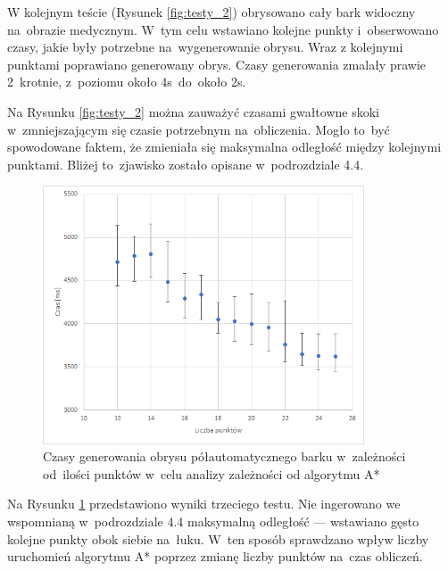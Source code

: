 \documentclass[a4paper,11pt,twoside,openright]{report}
\theoremstyle{definition}
\begin{document}
\bigskip

W kolejnym teście (Rysunek \ref{fig:testy_2}) obrysowano
cały bark widoczny na~obrazie medycznym. W~tym celu wstawiano kolejne
punkty i~obserwowano czasy, jakie były potrzebne na~wygenerowanie obrysu. Wraz z
kolejnymi punktami poprawiano generowany obrys. Czasy generowania zmalały prawie 2~krotnie, z~poziomu
około 4s~do~około 2s.



Na Rysunku \ref{fig:testy_2} można zauważyć czasami gwałtowne skoki w~zmniejszającym
się czasie potrzebnym na~obliczenia. Mogło to~być spowodowane faktem, że zmieniała
się maksymalna odległość między kolejnymi punktami. Bliżej to~zjawisko zostało
opisane w~podrozdziale 4.4.

\begin{figure}[h!]
	\center
	\includegraphics[width=0.85\textwidth]{150}
	\caption{Czasy generowania obrysu półautomatycznego barku w~zależności od~ilości punktów
	w~celu analizy zależności od algorytmu A*}
    	\label{fig:testy_3}
\end{figure}

Na Rysunku \ref{fig:testy_3} przedstawiono wyniki trzeciego testu. Nie ingerowano
we wspomnianą w~podrozdziale 4.4 maksymalną odległość --- wstawiano gęsto kolejne
punkty obok siebie na~łuku. W~ten sposób sprawdzano wpływ liczby uruchomień
algorytmu A* poprzez zmianę liczby punktów na~czas obliczeń.
\end{document}
